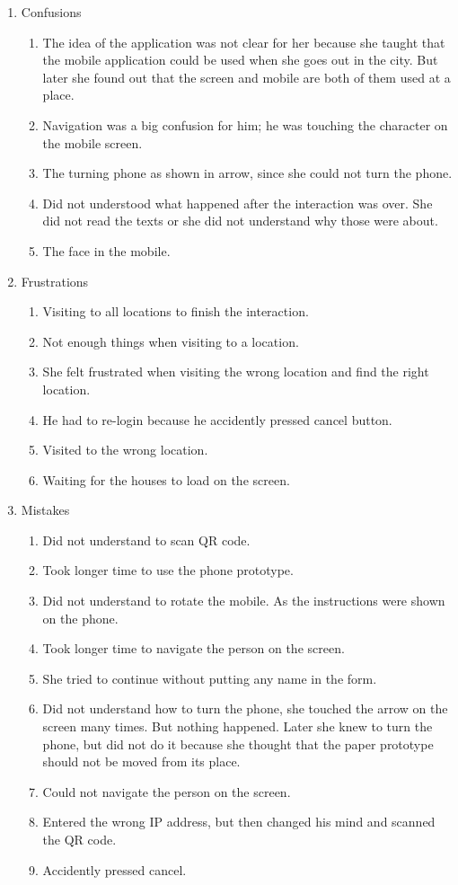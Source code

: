 \begin{enumerate}

\item Confusions
\begin{enumerate}
\item  The idea of the application was not clear for her because she taught that the mobile application could be used when she goes out in the city. But later she found out that the screen and mobile are both of them used at a place.
\item  Navigation was a big confusion for him; he was touching the character on the mobile screen.
\item  The turning phone as shown in arrow, since she could not turn the phone.
\item  Did not understood what happened after the interaction was over. She did not read the texts or she did not understand why those were about.
\item  The face in the mobile.
\end{enumerate}

\item Frustrations
\begin{enumerate}
\item  Visiting to all locations to finish the interaction.
\item  Not enough things when visiting to a location.
\item  She felt frustrated when visiting the wrong location and find the right location.
\item  He had to re-login because he accidently pressed cancel button.
\item  Visited to the wrong location.
\item  Waiting for the houses to load on the screen.
\end{enumerate}

\item Mistakes
\begin{enumerate}
\item  Did not understand to scan QR code.
\item  Took longer time to use the phone prototype. 
\item  Did not understand to rotate the mobile. As the instructions were shown on the phone.
\item  Took longer time to navigate the person on the screen.
\item  She tried to continue without putting any name in the form.
\item  Did not understand how to turn the phone, she touched the arrow on the screen many times. But nothing happened. Later she knew to turn the phone, but did not do it because she thought that the paper prototype should not be moved from its place.
\item  Could not navigate the person on the screen.
\item  Entered the wrong IP address, but then changed his mind and scanned the QR code.
\item  Accidently pressed cancel.
\end{enumerate}


\end{enumerate}
